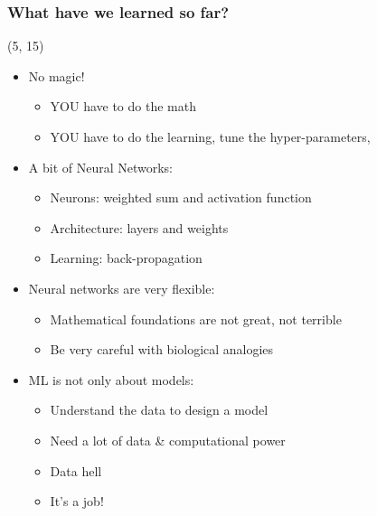 \begin{frame}
  \frametitle{What have we learned so far?}

  \begin{textblock}{90}(5, 15)
    \begin{itemize}
    \item<1-> No magic!
      \begin{itemize}
      \item YOU have to do the math
      \item YOU have to do the learning, tune the hyper-parameters, \etc{}
      \end{itemize}
    \item<2-> A bit of Neural Networks:
      \begin{itemize}
      \item Neurons: weighted sum and activation function
      \item Architecture: layers and weights
      \item Learning: back-propagation
      \end{itemize}
    \item<3-> Neural networks are very flexible:
      \begin{itemize}
      \item Mathematical foundations are not great, not terrible
      \item Be very careful with biological analogies
      \end{itemize}
    \item<4-> \ac{ML} is not only about models:
      \begin{itemize}
      \item Understand the data to design a model
      \item Need a lot of data \& computational power
      \item Data hell
      \item It's a job!
      \end{itemize}
    \end{itemize}
  \end{textblock}
\end{frame}
